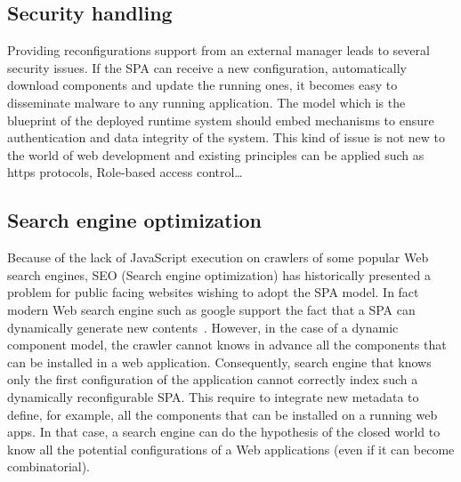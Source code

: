 \subsection{Security handling}
Providing reconfigurations support from an external manager leads to several security issues. 
If the SPA can receive a new configuration, automatically download components and update the running ones, it becomes easy to disseminate malware to any running application. 
The model which is the blueprint of the deployed runtime system should embed mechanisms to ensure authentication and data integrity of the system. 
This kind of issue is not new to the world of web development and existing principles can be applied such as https protocols, Role-based access control\dots

\subsection{Search engine optimization}
Because of the lack of JavaScript execution on crawlers of some popular Web search engines, SEO (Search engine optimization) has historically presented a problem for public facing websites wishing to adopt the SPA model. In fact modern Web search engine such as google support the fact that a SPA can dynamically generate new contents~\cite{googlesearch}. However, in the case of a dynamic component model, the crawler cannot knows in advance all the components that can be installed in a web application. Consequently, search engine that knows only the first configuration of the application cannot correctly index such a dynamically reconfigurable SPA. This require to integrate new metadata to define, for example, all the components that can be installed on a running web apps. In that case, a search engine can do the hypothesis of the closed world to know all the potential configurations of a Web applications (even if it can become combinatorial).  

